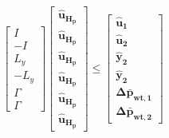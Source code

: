 \begin{equation}
	\begin{bmatrix}
		I 	\\
		-I 	\\
		L_{y}	\\
		-L_{y}	\\
		\Gamma	\\
		\Gamma
	\end{bmatrix}
	\begin{bmatrix}
			\bm{\hat{u}_{H_p}}	\\
			\bm{\hat{u}_{H_p}} 		\\
			\bm{\hat{u}_{H_p}} 		\\
			\bm{\hat{u}_{H_p}} 		\\
			\bm{\hat{u}_{H_p}} 		\\
			\bm{\hat{u}_{H_p}}
	\end{bmatrix}
	\leq 
	\begin{bmatrix}
			\bm{\hat{u}_{1}}	\\
			\bm{\hat{u}_{2}}	\\
			\bm{\hat{y}_{2}}	\\
			\bm{\hat{y}_{2}}	\\
			\bm{\Delta \bar{p}_{wt,1}}	\\
			\bm{\Delta \bar{p}_{wt,2}}	
	\end{bmatrix}
\end{equation}






